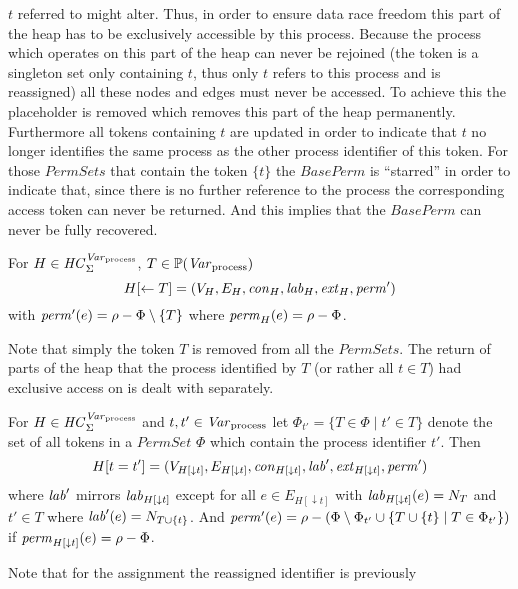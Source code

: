 	$t$ referred to might alter. Thus, in order to ensure data race freedom this
	part of the heap has to be exclusively accessible by this process. Because
	the process which operates on this part of the heap can never be rejoined
	(the token is a singleton set only containing $t$, thus only $t$ refers to
	this process and is reassigned) all these nodes and edges
	must never be accessed. To achieve this the placeholder is removed which
	removes this part of the heap permanently. Furthermore all tokens containing
	$t$ are updated in order to indicate that $t$ no longer identifies the same
	process as the other process identifier of this token. For those
	$\mathit{PermSets}$ that contain the token $\{t\}$ the $\mathit{BasePerm}$
	is \enquote{starred} in order to indicate that, since there is no further
	reference to the process the corresponding access token can never be
	returned. And this implies that the $\mathit{BasePerm}$ can never be fully
	recovered.
	\begin{definition}
		For $H\in\mathit{HC}_{\Sigma}^{\mathit{Var}_{\text{process}}}$, $T\in\mathbb{P}(\mathit{Var}_{\text{process}})$
		\begin{equation*}
			H[\leftarrow T] = (V_{H}, E_{H}, \mathit{con}_{H}, \mathit{lab}_{H}, \mathit{ext}_{H}, \mathit{perm}')
		\end{equation*}
		with $\mathit{perm}'(e) = \rho - \Phi\setminus\{T\}$ where
		$\mathit{perm}_{H}(e) = \rho -\Phi$.
	\end{definition}
	Note that simply the token $T$ is removed from all the $\mathit{PermSets}$.
	The return of parts of the heap that the process identified by $T$ (or
	rather all $t\in T$) had exclusive access on is dealt with separately.
	\begin{definition}
		For $H\in\mathit{HC}_{\Sigma}^{\mathit{Var}_{\text{process}}}$ and $t,t'\in\mathit{Var}_{\text{process}}$ let
		$\Phi_{t'} = \{ T\in\Phi \mid t'\in T\}$ denote the set of all
		tokens in a $\mathit{PermSet}$ $\Phi$ which contain the process
		identifier $t'$. Then
		\begin{equation*}
			H[t = t'] = (V_{H[\downarrow t]}, E_{H[\downarrow t]},
				\mathit{con}_{H[\downarrow t]}, \mathit{lab}',
				\mathit{ext}_{H[\downarrow t]}, \mathit{perm}')
		\end{equation*}
		where $\mathit{lab}'$ mirrors $\mathit{lab}_{H[\downarrow t]}$ except for all
		$e\in E_{H[\downarrow t]}$ with $\mathit{lab}_{H[\downarrow t]}(e) = N_{T}$ and
		$t'\in T$ where $\mathit{lab}'(e) = N_{T\cup\{t\}}$. And
		$\mathit{perm}'(e)=\rho-(\Phi\setminus\Phi_{t'}\cup
		\{T\cup\{t\}\mid T\in\Phi_{ t'}\})$ if
		$\mathit{perm}_{H[\downarrow t]}(e) = \rho-\Phi$.
	\end{definition}
	Note that for the assignment the reassigned identifier is previously
